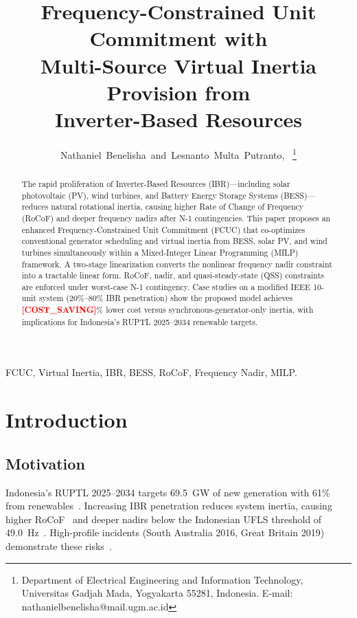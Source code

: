 \documentclass[journal]{IEEEtran}
\newcommand{\RESULT}[1]{\textcolor{red}{\textbf{[#1]}}}
\begin{document}
\title{Frequency-Constrained Unit Commitment with\\
Multi-Source Virtual Inertia Provision from\\
Inverter-Based Resources}

\author{Nathaniel~Benelisha~and~Lesnanto~Multa~Putranto,~
\thanks{Department of Electrical Engineering and Information Technology,
Universitas Gadjah Mada, Yogyakarta 55281, Indonesia.
E-mail: nathanielbenelisha@mail.ugm.ac.id}}
\maketitle

\begin{abstract}
The rapid proliferation of Inverter-Based Resources
(IBR)---including solar photovoltaic (PV), wind turbines,
and Battery Energy Storage Systems (BESS)---reduces natural
rotational inertia, causing higher Rate of Change of
Frequency (RoCoF) and deeper frequency nadirs after N-1
contingencies. This paper proposes an enhanced
Frequency-Constrained Unit Commitment (FCUC) that
co-optimizes conventional generator scheduling and virtual
inertia from BESS, solar PV, and wind turbines simultaneously
within a Mixed-Integer Linear Programming (MILP) framework.
A two-stage linearization converts the nonlinear frequency
nadir constraint into a tractable linear form. RoCoF, nadir,
and quasi-steady-state (QSS) constraints are enforced under
worst-case N-1 contingency. Case studies on a modified IEEE
10-unit system (20\%--80\% IBR penetration) show the
proposed model achieves \RESULT{COST\_SAVING}\% lower cost
versus synchronous-generator-only inertia, with implications
for Indonesia's RUPTL 2025--2034 renewable targets.
\end{abstract}

\begin{IEEEkeywords}
FCUC, Virtual Inertia, IBR, BESS, RoCoF, Frequency Nadir, MILP.
\end{IEEEkeywords}

\section{Introduction}

\subsection{Motivation}
Indonesia's RUPTL 2025--2034 targets 69.5~GW of new
generation with 61\% from renewables~\cite{PLN2025}.
Increasing IBR penetration reduces system inertia, causing
higher RoCoF~\cite{Tielens2016} and deeper nadirs below the
Indonesian UFLS threshold of 49.0~Hz~\cite{ESDM2007}.
High-profile incidents (South Australia 2016, Great Britain
2019) demonstrate these risks~\cite{AEMO2017}.
\end{document}
